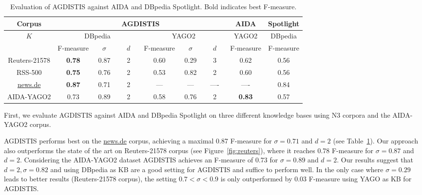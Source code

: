 \documentclass{llncs}
\begin{document}
\begin{table}[hb!]
\centering
\caption{Evaluation of AGDISTIS against AIDA and DBpedia Spotlight. Bold indicates best \mbox{F-measure}.} \label{tab:evalold} 
\begin{tabular}{c ccc ccc c c}
\toprule
\textbf{Corpus}  & \multicolumn{6}{c}{\textbf{AGDISTIS}}	& \textbf{AIDA} & \textbf{Spotlight}\\\midrule
\textbf{$K$}& \multicolumn{3}{c}{{DBpedia}}& \multicolumn{3}{c}{{YAGO2}}	& {YAGO2} & {DBpedia}\\\midrule
				& \mbox{F-measure} 		& $\quad \sigma \quad $ & $\quad d \quad $ 	& \mbox{F-measure} & $\quad \sigma \quad $ & $\quad d \quad $ & \mbox{F-measure}  & \mbox{F-measure}\\
\cmidrule(r){2-4}  \cmidrule(r){5-7} \cmidrule{8-8} \cmidrule{9-9}
Reuters-21578	&  	\textbf{0.78}	&  			0.87		&  		2		& 	0.60	&  0.29		&  	3	&  	0.62		& 	0.56	\\
RSS-500 		&  	\textbf{0.75}	&  			0.76		&  		2		& 	0.53	&  0.82		&   2 	&  	0.60		& 	0.56	\\
\url{news.de} 	&  	\textbf{0.87}	&  			0.71		&  		2		& 	---		&   ---		&  ----	&  	----		& 	0.84	\\
AIDA-YAGO2	   	&  		0.73		&  			0.89		&  		2		& 	0.58	&  0.76		&   2 	&\textbf{0.83}	& 	0.57	\\
\bottomrule
\end{tabular}
\end{table}

First, we evaluate AGDISTIS against AIDA and DBpedia Spotlight on three different knowledge bases using N3 corpora and the AIDA-YAGO2 corpus. 

AGDISTIS performs best on the \url{news.de} corpus, achieving a maximal 0.87 \mbox{F-measure} for $\sigma = 0.71$ and $d = 2$ (see Table~\ref{tab:evalold}).
Our approach also outperforms the state of the art on Reuters-21578 corpus (see Figure~\ref{fig:reuters}), where it reaches 0.78 \mbox{F-measure} for $\sigma = 0.87$ and $d = 2$.
Considering the AIDA-YAGO2 dataset AGDISTIS achieves an \mbox{F-measure} of 0.73 for $\sigma = 0.89$ and $d = 2$.
Our results suggest that $d=2, \sigma=0.82$ and using DBpedia as KB are a good setting for AGDISTIS and suffice to perform well. %
In the only case where $\sigma=0.29$ leads to better results (Reuters-21578 corpus), the setting $0.7<\sigma<0.9$ is only outperformed by 0.03 F-measure using YAGO as KB for AGDISTIS.
\end{document}
